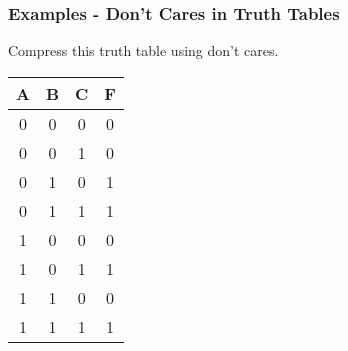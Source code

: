 \begin{frame}\frametitle{Examples - Don't Cares in Truth Tables}


\begin{tcolorbox}[enhanced,attach boxed title to top center={yshift=-3mm,yshifttext=-1mm},
  colback=red!5!white,colframe=red!75!black,colbacktitle=red!80!black,
  title=Try this,fonttitle=\bfseries,
  boxed title style={size=small,colframe=red!50!black} ]
  Compress this truth table using don't cares.  
 {\footnotesize
\begin{center}
    \begin{tabular}{ ccc|c}
    \hline 
    A & B & C & F  \\ \hline
    0 & 0 & 0 & 0  \\
    0 & 0 & 1 & 0  \\
    0 & 1 & 0 & 1\\
    0 & 1 & 1 & 1 \\
    \hline
     1 & 0 & 0 & 0  \\
    1 & 0 & 1 & 1  \\
    1 & 1 & 0 &0 \\
    1 & 1 & 1 & 1\\
    
\end{tabular}
\end{center}}
\end{tcolorbox}



\end{frame}

